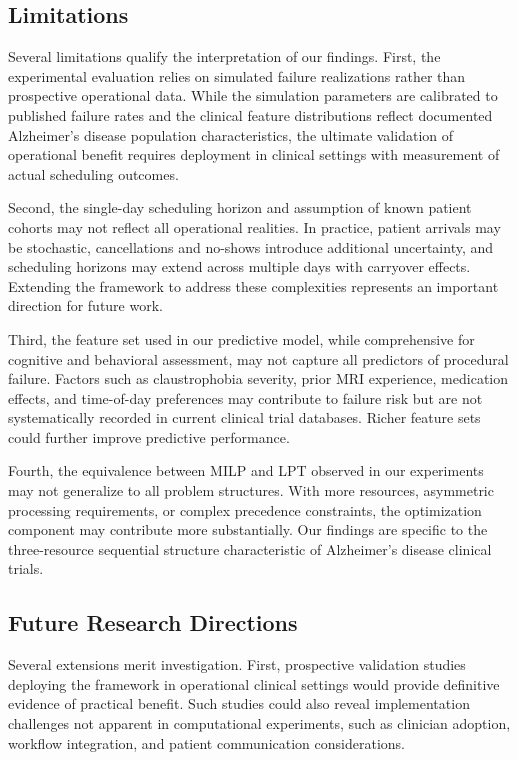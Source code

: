 \documentclass[msom,blindrev]{informs3}
\begin{document}
\subsection{Limitations}

Several limitations qualify the interpretation of our findings. First, the experimental evaluation relies on simulated failure realizations rather than prospective operational data. While the simulation parameters are calibrated to published failure rates and the clinical feature distributions reflect documented Alzheimer's disease population characteristics, the ultimate validation of operational benefit requires deployment in clinical settings with measurement of actual scheduling outcomes.

Second, the single-day scheduling horizon and assumption of known patient cohorts may not reflect all operational realities. In practice, patient arrivals may be stochastic, cancellations and no-shows introduce additional uncertainty, and scheduling horizons may extend across multiple days with carryover effects. Extending the framework to address these complexities represents an important direction for future work.

Third, the feature set used in our predictive model, while comprehensive for cognitive and behavioral assessment, may not capture all predictors of procedural failure. Factors such as claustrophobia severity, prior MRI experience, medication effects, and time-of-day preferences may contribute to failure risk but are not systematically recorded in current clinical trial databases. Richer feature sets could further improve predictive performance.

Fourth, the equivalence between MILP and LPT observed in our experiments may not generalize to all problem structures. With more resources, asymmetric processing requirements, or complex precedence constraints, the optimization component may contribute more substantially. Our findings are specific to the three-resource sequential structure characteristic of Alzheimer's disease clinical trials.

\subsection{Future Research Directions}

Several extensions merit investigation. First, prospective validation studies deploying the framework in operational clinical settings would provide definitive evidence of practical benefit. Such studies could also reveal implementation challenges not apparent in computational experiments, such as clinician adoption, workflow integration, and patient communication considerations.
\end{document}
